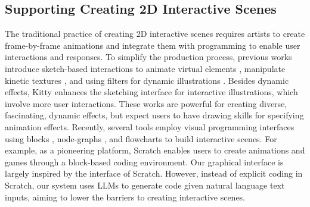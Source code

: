 \subsection{Supporting Creating 2D Interactive Scenes}
The traditional practice of creating 2D interactive scenes requires artists to create frame-by-frame animations and integrate them with programming to enable user interactions and responses. To simplify the production process, previous works introduce sketch-based interactions to animate virtual elements \cite{liu2020posetween}, manipulate kinetic 
textures
\cite{kazi2014draco}, and using filters for dynamic illustrations \cite{xing2016energy}. Besides dynamic effects, Kitty \cite{kazi2014kitty} enhances the sketching interface for interactive illustrations, which {involve} %
more user interactions. These works are powerful for creating diverse, fascinating, dynamic effects, but expect users to have drawing skills 
{for specifying animation effects}. Recently, several tools employ visual programming interfaces using blocks \cite{ye2024prointerar}, node-graphs \cite{snap_lensstudio, unreal_blueprints}, and flowcharts \cite{chen2021entanglevr, yigitbas2023end, zhang2020flowmatic} to build interactive scenes. {For example,} as a pioneering platform, Scratch \cite{scratch} enables users to create animations and games through a block-based coding environment. {Our graphical interface is largely inspired by the interface of Scratch. However, instead of explicit coding in Scratch, our system uses LLMs to generate code given natural language text inputs, aiming to lower the barriers to creating interactive scenes.} 


